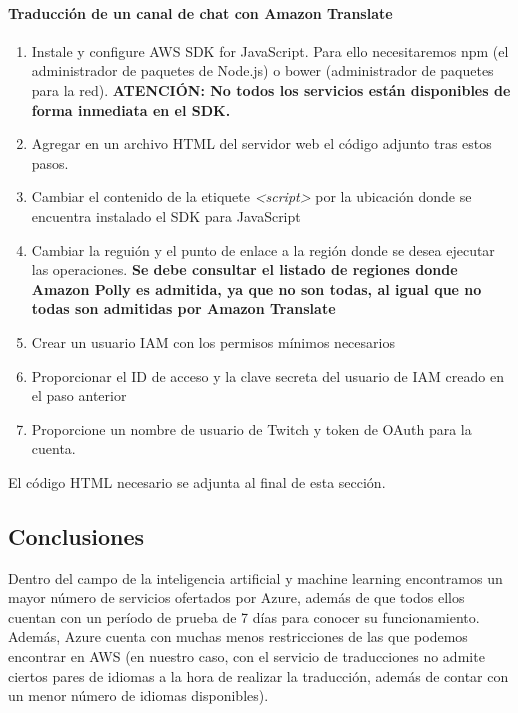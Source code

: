 \documentclass[english,runningheads,a4paper]{llncs}[2018/03/10]
\begin{document}
    \paragraph{Traducción de un canal de chat con Amazon Translate}
    \begin{enumerate}
        \item Instale y configure AWS SDK for JavaScript. Para ello 
        necesitaremos npm (el administrador de paquetes de Node.js) o bower 
        (administrador de paquetes para la red). \textbf{ATENCIÓN: No todos los 
        servicios están disponibles de forma inmediata en el SDK.}
        \item Agregar en un archivo HTML del servidor web el código adjunto tras
        estos pasos.
        
        \item Cambiar el contenido de la etiquete \textit{<script>}
        por la ubicación donde se encuentra instalado el SDK para JavaScript
        \item Cambiar la reguión y el punto de enlace a la región donde se desea
        ejecutar las operaciones. \textbf{Se debe consultar el listado de 
        regiones donde Amazon Polly es admitida, ya que no son todas, al igual 
        que no todas son admitidas por Amazon Translate}
        \item Crear un usuario IAM con los permisos mínimos necesarios
        \item Proporcionar el ID de acceso y la clave secreta del usuario de IAM
        creado en el paso anterior
        \item Proporcione un nombre de usuario de Twitch y token de OAuth para 
        la cuenta.
    \end{enumerate}
    
    El código HTML necesario se adjunta al final de esta sección.

    
    \subsection{Conclusiones}
    Dentro del campo de la inteligencia artificial y machine learning 
    encontramos un mayor número de servicios ofertados por Azure, además de que 
    todos ellos cuentan con un período de prueba de 7 días para conocer su 
    funcionamiento. Además, Azure cuenta con muchas menos restricciones de las 
    que podemos encontrar en AWS (en nuestro caso, con el servicio de 
    traducciones no admite ciertos pares de idiomas a la hora de realizar la 
    traducción, además de contar con un menor número de idiomas disponibles).
    
\end{document}
